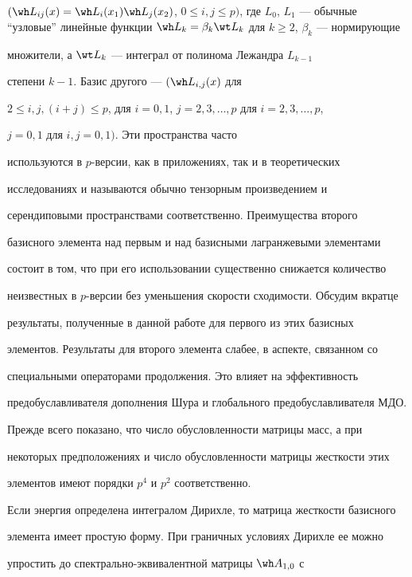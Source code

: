 $(\wh L_{ij}(x)=\wh L_i(x_1)\wh L_j(x_2)$, $0\le i,j


\le p)$, где $L_0$, $L_1$ --- обычные ``узловые'' линейные функции $\wh


L_k=\beta_k\wt L_k$ для $k\ge2$, $\beta_k$ --- нормирующие


множители, а $\wt L_k$ --- интеграл от полинома Лежандра $L_{k-1}$


степени $k-1$. Базис другого --- $(\wh L_{i,j}(x)$ для


$2\le i,j,(i+j)\le p$, для $i=0,1$, $j=2,3,\dotsc,p$ для $i=2,3,\dotsc,p$,


$j=0,1$ для $i,j=0,1)$. Эти пространства часто


используются в $p$-версии, как в приложениях, так и в теоретических


исследованиях и называются обычно тензорным произведением и


серендиповыми пространствами соответственно. Преимущества второго


базисного элемента над первым и над базисными лагранжевыми элементами


состоит в том, что при его использовании существенно снижается количество


неизвестных в $p$-версии без уменьшения скорости сходимости. Обсудим вкратце


результаты, полученные в данной работе для первого из этих базисных


элементов. Результаты для второго элемента слабее, в аспекте, связанном со


специальными операторами продолжения. Это влияет на эффективность


предобуславливателя дополнения Шура и глобального предобуславливателя МДО.





Прежде всего показано, что число обусловленности матрицы масс, а при


некоторых предположениях и число обусловленности матрицы жесткости этих


элементов имеют порядки $p^4$ и $p^2$ соответственно.





Если энергия определена интегралом Дирихле, то матрица жесткости базисного


элемента имеет простую форму. При граничных условиях Дирихле ее можно


упростить до спектрально-эквивалентной матрицы $\wh A_{1,0}$ с


